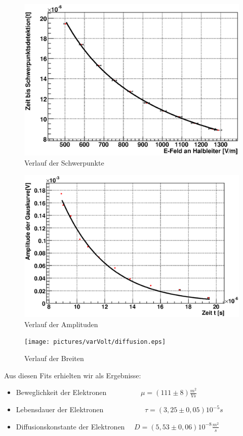 \documentclass[12pt]{article}
\begin{document}
\begin{figure}[H]  
\includegraphics[width=0.9\linewidth]{pictures/varVolt/movabilty.eps}
\caption{Verlauf der Schwerpunkte}
\end{figure}

\begin{figure}[H]  
\includegraphics[width=0.9\linewidth]{pictures/varVolt/lifetime.eps}
\caption{Verlauf der Amplituden}
\end{figure}

\begin{figure}[H]  
\texttt{[image: pictures/varVolt/diffusion.eps]}
\caption{Verlauf der Breiten}
\end{figure}
\newpage

Aus diesen Fits erhielten wir als Ergebnisse:
\begin{itemize}
 \item Beweglichkeit der Elektronen ~~~~~~~~~$\mu = (111 \pm 8) \frac{m^2}{Vs}$ 
 \item Lebensdauer der Elektronen ~~~~~~~~~~~$\tau = (3,25 \pm 0,05) 10^{-5} s $
 \item Diffusionskonstante der Elektronen ~~$D = (5,53 \pm 0,06) 10^{-8} \frac{m^2}{s}$
\end{itemize}
\end{document}
